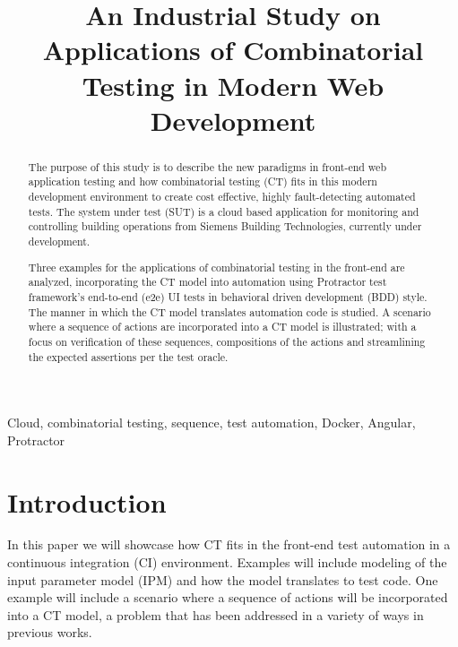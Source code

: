 \documentclass[conference]{IEEEtran}
\begin{document}
\title{An Industrial Study on Applications of Combinatorial Testing in Modern Web Development}


\author{
}

\maketitle


\begin{abstract}
The purpose of this study is to describe the new paradigms in front-end web application testing and how combinatorial testing (CT) fits in this modern development environment to create cost effective, highly fault-detecting automated tests.
The system under test (SUT) is a cloud based application for monitoring and controlling building operations from Siemens Building Technologies, currently under development.

Three examples for the applications of combinatorial testing in the front-end are analyzed,
incorporating the CT model into automation using Protractor test framework's end-to-end (e2e) UI tests in behavioral driven development (BDD) style. 
The manner in which the CT model translates automation code is studied.
A scenario where a sequence of actions are incorporated into a CT model is illustrated;
with a focus on verification of these sequences, compositions of the actions and streamlining the expected assertions per the test oracle.

\end{abstract}

\begin{IEEEkeywords}
Cloud, combinatorial testing, sequence, test automation, Docker, Angular, Protractor
\end{IEEEkeywords}

\section{Introduction}

In this paper we will showcase how CT fits in the front-end test automation in a continuous integration (CI) environment.
Examples will include modeling of the input parameter model (IPM) and how the model translates to test code.
One example will include a scenario where a sequence of actions will be incorporated into a CT model, a problem that has been addressed in a variety of ways in previous works.
\end{document}
